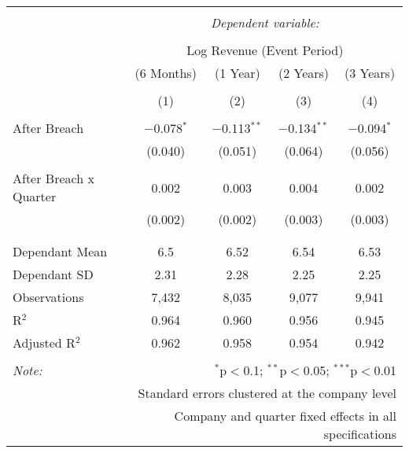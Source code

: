 
\begin{table}[!htbp] \centering 
  \caption{} 
  \label{} 
\begin{tabular}{@{\extracolsep{5pt}}lcccc} 
\\[-1.8ex]\hline 
\hline \\[-1.8ex] 
 & \multicolumn{4}{c}{\textit{Dependent variable:}} \\ 
\cline{2-5} 
\\[-1.8ex] & \multicolumn{4}{c}{Log Revenue (Event Period)} \\ 
 & (6 Months) & (1 Year) & (2 Years) & (3 Years) \\ 
\\[-1.8ex] & (1) & (2) & (3) & (4)\\ 
\hline \\[-1.8ex] 
 After Breach & $-$0.078$^{*}$ & $-$0.113$^{**}$ & $-$0.134$^{**}$ & $-$0.094$^{*}$ \\ 
  & (0.040) & (0.051) & (0.064) & (0.056) \\ 
  & & & & \\ 
 After Breach x Quarter & 0.002 & 0.003 & 0.004 & 0.002 \\ 
  & (0.002) & (0.002) & (0.003) & (0.003) \\ 
  & & & & \\ 
\hline \\[-1.8ex] 
Dependant Mean & 6.5 & 6.52 & 6.54 & 6.53 \\ 
Dependant SD & 2.31 & 2.28 & 2.25 & 2.25 \\ 
Observations & 7,432 & 8,035 & 9,077 & 9,941 \\ 
R$^{2}$ & 0.964 & 0.960 & 0.956 & 0.945 \\ 
Adjusted R$^{2}$ & 0.962 & 0.958 & 0.954 & 0.942 \\ 
\hline 
\hline \\[-1.8ex] 
\textit{Note:}  & \multicolumn{4}{r}{$^{*}$p$<$0.1; $^{**}$p$<$0.05; $^{***}$p$<$0.01} \\ 
 & \multicolumn{4}{r}{Standard errors clustered at the company level} \\ 
 & \multicolumn{4}{r}{Company and quarter fixed effects in all specifications} \\ 
\end{tabular} 
\end{table} 
